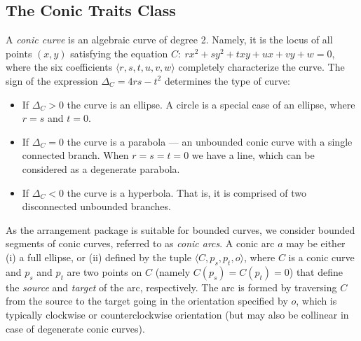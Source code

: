 \subsection{The Conic Traits Class}
\label{arr_ssec:tr_conic}
%
A {\em conic curve} is an algebraic curve of degree 2. Namely, it
is the locus of all points $(x,y)$ satisfying the equation $C:\ r
x^2 + s y^2 + t xy + u x + v y + w = 0$, where the six
coefficients $\langle r, s, t, u, v, w \rangle$ completely
characterize the curve. The sign of the expression $\Delta_{C} = 4
r s - t^2$ determines the type of curve:
\begin{itemize}
\item If $\Delta_{C} > 0$ the curve is an ellipse. A circle is a
special case of an ellipse, where $r = s$ and $t = 0$.
%
\item If $\Delta_{C} = 0$ the curve is a parabola --- an unbounded
conic curve with a single connected branch. When $r = s = t = 0$
we have a line, which can be considered as a degenerate parabola.
%
\item If $\Delta_{C} < 0$ the curve is a hyperbola. That is, it
is comprised of two disconnected unbounded branches.
\end{itemize}

As the arrangement package is suitable for bounded curves, we
consider bounded segments of conic curves, referred to as {\em
conic arcs}. A conic arc $a$ may be either (i) a full ellipse, or
(ii) defined by the tuple $\langle C, p_s, p_t, o \rangle$, where
$C$ is a conic curve and $p_s$ and $p_t$ are two points on $C$
(namely $C(p_s) = C(p_t) = 0$) that define the {\em source} and
{\em target} of the arc, respectively. The arc is formed by
traversing $C$ from the source to the target going in the
orientation specified by $o$, which is typically clockwise or
counterclockwise orientation (but may also be collinear in case of
degenerate conic curves).

